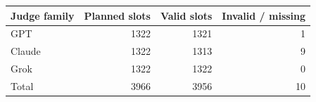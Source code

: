 \begin{tabular}{lrrr}
\toprule
Judge family & Planned slots & Valid slots & Invalid / missing\\
\midrule
GPT & 1322 & 1321 & 1\\
Claude & 1322 & 1313 & 9\\
Grok & 1322 & 1322 & 0\\
Total & 3966 & 3956 & 10\\
\bottomrule
\end{tabular}
